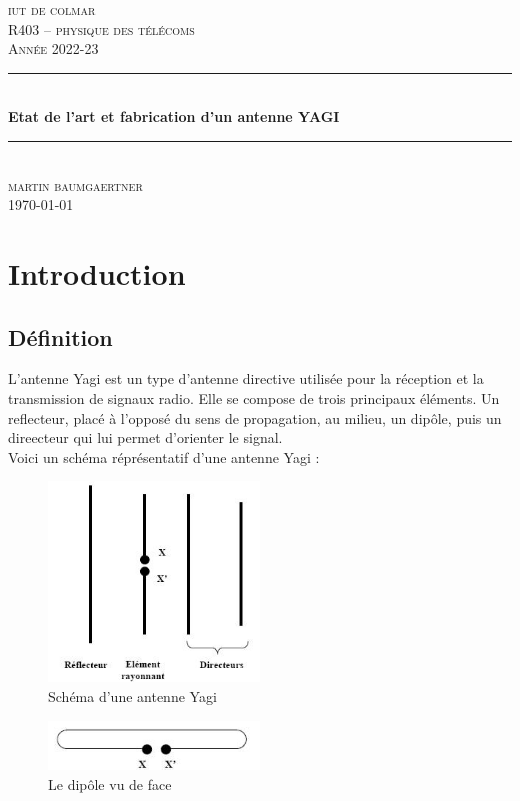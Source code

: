 \documentclass[12pt, a4paper]{article}
\begin{document}
\begin{titlepage}
	\newcommand{\HRule}{\rule{\linewidth}{0.5mm}} 
	\center 
	\textsc{\LARGE iut de colmar}\\[6.5cm] 
	\textsc{\Large R403 -- physique des télécoms}\\[0.5cm] 
	\textsc{\large Année 2022-23}\\[0.5cm]
	\HRule\\[0.75cm]
	{\Large\bfseries Etat de l'art et fabrication d'un antenne YAGI}\\[0.4cm]
	\HRule\\[1.5cm]
	\textsc{\large martin baumgaertner}\\[6cm] 

	\vfill\vfill\vfill
	{\large\today} 
	\vfill
\end{titlepage}
\newpage
\tableofcontents
\listoffigures
\newpage
\section{Introduction}
\subsection{Définition}
L'antenne Yagi est un type d'antenne directive utilisée 
pour la réception et la transmission de signaux radio. 
Elle se compose de trois principaux éléments. Un reflecteur,
placé à l'opposé du sens de propagation, au milieu, 
un dipôle, puis un direecteur qui lui permet d'orienter
le signal.\\

Voici un schéma réprésentatif d'une antenne Yagi :
\begin{figure}[h]
    \centering
    \includegraphics[width=0.5\textwidth]{img/yagi.jpg}
    \caption{Schéma d'une antenne Yagi \cite{r1}}
    \label{fig:yagi}
\end{figure}

\begin{figure}[h]
    \centering
    \includegraphics[width=0.5\textwidth]{img/trombone-yagi.jpg}
    \caption{Le dipôle vu de face \cite{r1}}
    \label{fig:yagi-de-face}
\end{figure}
\end{document}
